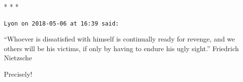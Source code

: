 
\begin{center}* * *\end{center}

\begin{footnotesize}
\begin{sffamily}
\texttt{Lyon on 2018-05-06 at 16:39 said:}

``Whoever is dissatisfied with himself is continually ready for revenge, and we others will be his victims, if only by having to endure his ugly sight.'' Friedrich Nietzsche

Precisely!


\hfill

\end{sffamily}
\end{footnotesize}

